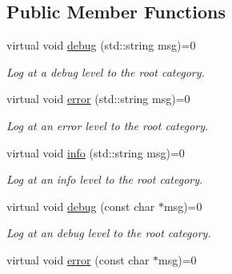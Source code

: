 \subsection*{Public Member Functions}
\begin{DoxyCompactItemize}
\item 
\hypertarget{classLoggingInterface_a94e666bf17b42a65c03aff86cbe04978}{virtual void \hyperlink{classLoggingInterface_a94e666bf17b42a65c03aff86cbe04978}{debug} (std\-::string msg)=0}\label{classLoggingInterface_a94e666bf17b42a65c03aff86cbe04978}

\begin{DoxyCompactList}\small\item\em Log at a debug level to the root category. \end{DoxyCompactList}\item 
\hypertarget{classLoggingInterface_a86ba6616c2163d8cb49bed70def8b862}{virtual void \hyperlink{classLoggingInterface_a86ba6616c2163d8cb49bed70def8b862}{error} (std\-::string msg)=0}\label{classLoggingInterface_a86ba6616c2163d8cb49bed70def8b862}

\begin{DoxyCompactList}\small\item\em Log at an error level to the root category. \end{DoxyCompactList}\item 
\hypertarget{classLoggingInterface_a5d994f7cfafe81171954409df64d77ce}{virtual void \hyperlink{classLoggingInterface_a5d994f7cfafe81171954409df64d77ce}{info} (std\-::string msg)=0}\label{classLoggingInterface_a5d994f7cfafe81171954409df64d77ce}

\begin{DoxyCompactList}\small\item\em Log at an info level to the root category. \end{DoxyCompactList}\item 
\hypertarget{classLoggingInterface_a82c2727fb66531d5eec19e39bed79671}{virtual void \hyperlink{classLoggingInterface_a82c2727fb66531d5eec19e39bed79671}{debug} (const char $\ast$msg)=0}\label{classLoggingInterface_a82c2727fb66531d5eec19e39bed79671}

\begin{DoxyCompactList}\small\item\em Log at an debug level to the root category. \end{DoxyCompactList}\item 
\hypertarget{classLoggingInterface_a1cea9e37dae316f39e171654e5e0dc0f}{virtual void \hyperlink{classLoggingInterface_a1cea9e37dae316f39e171654e5e0dc0f}{error} (const char $\ast$msg)=0}\label{classLoggingInterface_a1cea9e37dae316f39e171654e5e0dc0f}


\end{DoxyCompactItemize}
